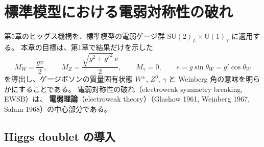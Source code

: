 \documentclass[uplatex,dvipdfmx,a4paper,11pt,openany]{jsbook}
\newcommand{\term}[2]{\textbf{#1}（#2）}
\newcommand{\en}[1]{（#1）}
\numberwithin{equation}{chapter}
\theoremstyle{definition}
\theoremstyle{plain}
\theoremstyle{remark}
\newcommand{\SU}{\mathrm{SU}}
\newcommand{\U}{\mathrm{U}}
\begin{document}
\chapter{標準模型における電弱対称性の破れ}
\label{ch:EWSB}
第5章のヒッグス機構を、標準模型の電弱ゲージ群 $\SU(2)_L\times\U(1)_Y$ に適用する。
本章の目標は、第1章で結果だけを示した
\begin{equation*}
M_W=\frac{gv}{2},\qquad M_Z=\frac{\sqrt{g^2+g'^2}\,v}{2},\qquad M_\gamma=0,\qquad e=g\sin\theta_W=g'\cos\theta_W
\end{equation*}
を導出し、ゲージボソンの質量固有状態 $W^\pm$, $Z^0$, $\gamma$ と Weinberg 角の意味を明らかにすることである。
電弱対称性の破れ\en{electroweak symmetry breaking, EWSB}は、
\term{電弱理論}{electroweak theory}（Glashow 1961, Weinberg 1967, Salam 1968）の中心部分である。
\section{Higgs doublet の導入}
\label{sec:higgs-doublet}
\end{document}
